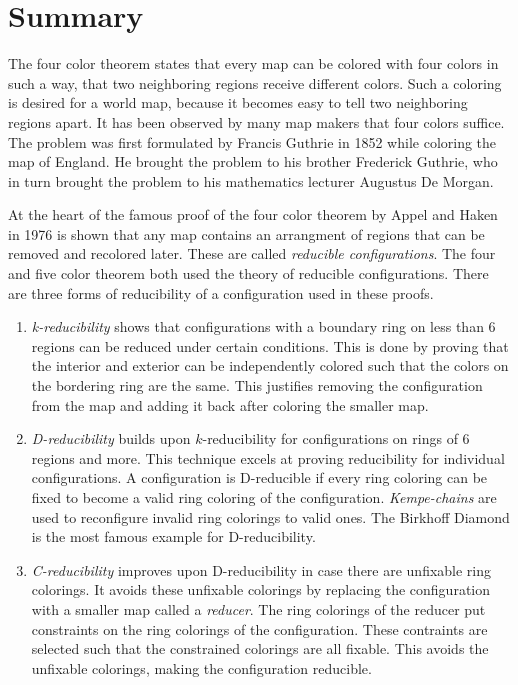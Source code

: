 \section*{Summary}
\label{sec:summary}

The four color theorem states that every map can be colored with four colors in such a way, that two neighboring regions receive different colors. Such a coloring is desired for a world map, because it becomes easy to tell two neighboring regions apart. It has been observed by many map makers that four colors suffice. The problem was first formulated by Francis Guthrie in 1852 while coloring the map of England. He brought the problem to his brother Frederick Guthrie, who in turn brought the problem to his mathematics lecturer Augustus De Morgan. 

At the heart of the famous proof of the four color theorem by Appel and Haken in 1976 \cite{appel} is shown that any map contains an arrangment of regions that can be removed and recolored later. These are called \textit{reducible configurations}. The four and five color theorem both used the theory of reducible configurations. There are three forms of reducibility of a configuration used in these proofs.

\begin{enumerate}
\item \textit{k-reducibility} shows that configurations with a boundary ring on less than 6 regions can be reduced under certain conditions. This is done by proving that the interior and exterior can be independently colored such that the colors on the bordering ring are the same. This justifies removing the configuration from the map and adding it back after coloring the smaller map.

\item \textit{D-reducibility} builds upon $k$-reducibility for configurations on rings of 6 regions and more. This technique excels at proving reducibility for individual configurations. A configuration is D-reducible if every ring coloring can be fixed to become a valid ring coloring of the configuration. \textit{Kempe-chains} are used to reconfigure invalid ring colorings to valid ones. The Birkhoff Diamond is the most famous example for D-reducibility.

\item \textit{C-reducibility} improves upon D-reducibility in case there are unfixable ring colorings. It avoids these unfixable colorings by replacing the configuration with a smaller map called a \textit{reducer}. The ring colorings of the reducer put constraints on the ring colorings of the configuration. These contraints are selected such that the constrained colorings are all fixable. This avoids the unfixable colorings, making the configuration reducible.
\end{enumerate}

